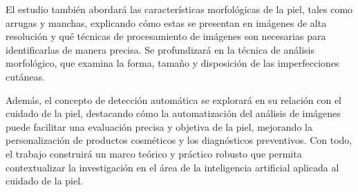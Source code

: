 El estudio también abordará las características morfológicas de la piel, tales como arrugas y manchas, explicando cómo estas se presentan en imágenes de alta resolución y qué técnicas de procesamiento de imágenes son necesarias para identificarlas de manera precisa. Se profundizará en la técnica de análisis morfológico, que examina la forma, tamaño y disposición de las imperfecciones cutáneas.

Además, el concepto de detección automática se explorará en su relación con el cuidado de la piel, destacando cómo la automatización del análisis de imágenes puede facilitar una evaluación precisa y objetiva de la piel, mejorando la personalización de productos cosméticos y los diagnósticos preventivos. Con todo, el trabajo construirá un marco teórico y práctico robusto que permita contextualizar la investigación en el área de la inteligencia artificial aplicada al cuidado de la piel.